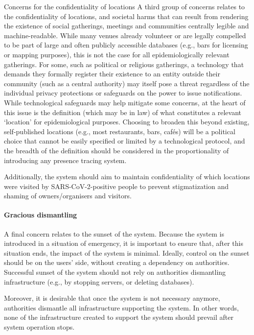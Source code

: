 Concerns for the confidentiality of locations	A third group of concerns relates to the confidentiality of locations, and societal harms that can result from rendering the existence of social gatherings, meetings and communities centrally legible and machine-readable. While many venues already volunteer or are legally compelled to be part of large and often publicly accessible databases (e.g., bars for licensing or mapping purposes), this is not the case for all epidemiologically relevant gatherings. For some, such as political or religious gatherings, a technology that demands they formally register their existence to an entity outside their community (such as a central authority) may itself pose a threat regardless of the individual privacy protections or safeguards on the power to issue notifications. While technological safeguards may help mitigate some concerns, at the heart of this issue is the definition (which may be in law) of what constitutes a relevant `location' for epidemiological purposes. Choosing to broaden this beyond existing, self-published locations (e.g., most restaurants, bars, cafés) will be a political choice that cannot be easily specified or limited by a technological protocol, and the breadth of the definition should be considered in the proportionality of introducing any presence tracing system.

Additionally, the system should aim to maintain confidentiality of which locations were visited by SARS-CoV-2-positive people to prevent stigmatization and shaming of owners/organisers and visitors.

\paragraph{Gracious dismantling}
A final concern relates to the sunset of the system. Because the system is introduced in a situation of emergency, it is important to ensure that, after this situation ends, the impact of the system is minimal. Ideally, control on the sunset should be on the users' side, without creating a dependency on authorities. Successful sunset of the system should not rely on authorities dismantling infrastructure (e.g., by stopping servers, or deleting databases).

Moreover, it is desirable that once the system is not necessary anymore, authorities dismantle all infrastructure supporting the system. In other words, none of the infrastructure created to support the system should prevail after system operation stops.
